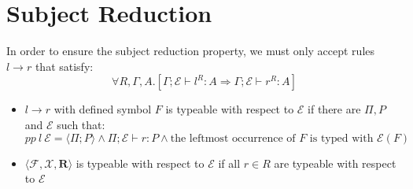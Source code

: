 \section{Subject Reduction}
In order to ensure the subject reduction property, we must only accept rules $l \to r$ that satisfy:
\[\forall R, \Gamma, A . [\Gamma;\mathcal{E} \vdash l^R : A \Rightarrow \Gamma;\mathcal{E} \vdash r^R : A]\]

\begin{itemize}
    \item {$l \to r$ with defined symbol $F$ is typeable with respect to $\mathcal{E}$ if there are $\Pi, P$ and $\mathcal{E}$ such that:
        \[pp \ l \ \mathcal{E} = \langle \Pi ; P \rangle \land \Pi; \mathcal{E} \vdash r : P \land \text{the leftmost occurrence of }F\text{ is typed with }\mathcal{E}(F) \]
    }
    \item $\langle \mathcal{F}, \mathcal{X}, \mathbf{R} \rangle$ is typeable with respect to $\mathcal{E}$ if all $r \in R$ are typeable with respect to $\mathcal{E}$
\end{itemize}

\unfinished
